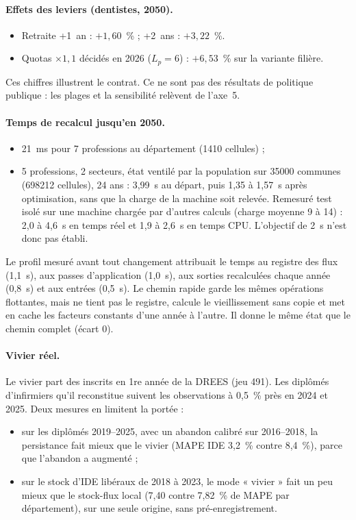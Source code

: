 \documentclass[11pt]{article}
\begin{document}
\paragraph{Effets des leviers (dentistes, 2050).}
\begin{itemize}
  \item Retraite +1~an : $+1{,}60$\mesure{}~\% ; +2~ans : $+3{,}22$\mesure{}~\%.
  \item Quotas $\times1{,}1$ décidés en 2026 ($L_p = 6$\suppose{}) : $+6{,}53$\mesure{}~\% sur la
        variante filière.
\end{itemize}
Ces chiffres illustrent le contrat. Ce ne sont pas des résultats de politique publique : les plages
et la sensibilité relèvent de l'axe~5.

\paragraph{Temps de recalcul jusqu'en 2050.}
\begin{itemize}
  \item 21\mesure{}~ms pour 7 professions au département (\num{1410} cellules) ;
  \item 5 professions, 2 secteurs, état ventilé par la population sur \num{35000} communes
        (\num{698212} cellules), 24 ans : 3,99\mesure{}~s au départ, puis 1,35 à 1,57\mesure{}~s
        après optimisation, sans que la charge de la machine soit relevée. Remesuré test isolé sur une
        machine chargée par d'autres calculs (charge moyenne 9 à 14) : 2,0 à 4,6\mesure{}~s en temps réel
        et 1,9 à 2,6\mesure{}~s en temps CPU. L'objectif de 2~s n'est donc pas établi.
\end{itemize}
Le profil mesuré avant tout changement attribuait le temps au registre des flux (1,1~s), aux passes
d'application (1,0~s), aux sorties recalculées chaque année (0,8~s) et aux entrées (0,5~s). Le chemin
rapide garde les mêmes opérations flottantes, mais ne tient pas le registre, calcule le vieillissement
sans copie et met en cache les facteurs constants d'une année à l'autre. Il donne le même état que le
chemin complet (écart 0).

\paragraph{Vivier réel.} Le vivier part des inscrits en 1re année de la DREES (jeu 491). Les diplômés
d'infirmiers qu'il reconstitue suivent les observations à 0,5~\% près en 2024 et 2025. Deux mesures en
limitent la portée :
\begin{itemize}
  \item sur les diplômés 2019--2025, avec un abandon calibré sur 2016--2018, la persistance fait mieux
        que le vivier (MAPE IDE 3,2\mesure{}~\% contre 8,4\mesure{}~\%), parce que l'abandon a
        augmenté ;
  \item sur le stock d'IDE libéraux de 2018 à 2023, le mode « vivier » fait un peu mieux que le
        stock-flux local (7,40\mesure{} contre 7,82\mesure{}~\% de MAPE par département), sur une
        seule origine, sans pré-enregistrement.
\end{itemize}
\end{document}
